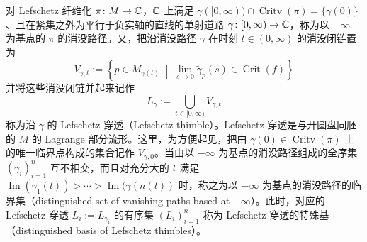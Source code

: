 对 Lefschetz 纤维化 $\pi\colon M\to\mathbb{C}$，$\mathbb{C}$ 上满足 $\gamma([0,\infty))\cap\operatorname{Critv}(\pi)=\{\gamma(0)\}$、且在紧集之外为平行于负实轴的直线的单射道路 $\gamma\colon[0,\infty)\to\mathbb{C}$，称为以 $-\infty$ 为基点的 $\pi$ 的消没路径。又，把沿消没路径 $\gamma$ 在时刻 $t\in(0,\infty)$ 的消没闭链置为
\begin{equation}
  V_{\gamma,t} := \left\{ p\in M_{\gamma(t)} \;\middle|\; \lim_{s\to0}\tilde\gamma_p(s)\in\operatorname{Crit}(f) \right\}
  \tag{13.1}
\end{equation}
并将这些消没闭链并起来记作
\begin{equation}
  L_\gamma := \bigcup_{t\in[0,\infty)}V_{\gamma,t}
  \tag{13.2}
\end{equation}
称为沿 $\gamma$ 的 Lefschetz 穿透（Lefschetz thimble）。Lefschetz 穿透是与开圆盘同胚的 $M$ 的 Lagrange 部分流形。这里，为方便起见，把由 $\gamma(0)\in\operatorname{Critv}(\pi)$ 上的唯一临界点构成的集合记作 $V_{\gamma,0}$。当由以 $-\infty$ 为基点的消没路径组成的全序集 $(\gamma_i)_{i=1}^n$ 互不相交，而且对充分大的 $t$ 满足 $\operatorname{Im}(\gamma_1(t))>\cdots>\operatorname{Im}(\gamma(n(t))$ 时，称之为以 $-\infty$ 为基点的消没路径的临界集（distinguished set of vanishing paths based at $-\infty$）。此时，对应的 Lefschetz 穿透 $L_i:=L_{\gamma_i}$ 的有序集 $(L_i)_{i=1}^n$ 称为 Lefschetz 穿透的特殊基（distinguished basis of Lefschetz thimbles）。


